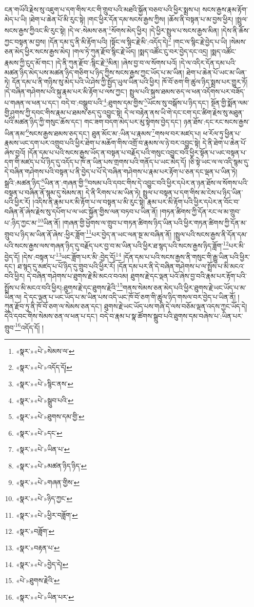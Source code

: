 ངན་གཡོའི་རྗེས་སུ་འཇུག་པ་དག་གིས་རང་གི་གྲུབ་པའི་མཐའི་སྐྱོན་བཅབ་པའི་ཕྱིར་སྨྲས་པ། སངས་རྒྱས་རྣམ་རྟོག་མེད་པ་ཡི། །ཐེག་པ་ཆེན་པོ་མི་རུང་སྟེ། །གང་ཕྱིར་དོན་དམ་སངས་རྒྱས་ཀྱིས། །ཆོས་ནི་བསྟན་པ་མ་བྱས་ཕྱིར། །སྤྲུལ་སངས་རྒྱས་ཀྱིའང་མི་རུང་སྟེ། །དེ་ལ་:སེམས་ཅན་\footnote{«སྣར་»«པེ་»སེམས་ལ་}སོགས་མེད་ཕྱིར། །དེ་ཕྱིར་སྤྲུལ་པ་སངས་རྒྱས་མིན། །དེས་ནི་ཆོས་ཀྱང་བསྟན་མ་བྱས། །དོན་དམ་དུ་ནི་མི་རྟོག་པའི། །སྟོང་ལ་སྙིང་རྗེ་མི་:འདོད་དེ།\footnote{«སྣར་»«པེ་»འདོད་དོ།} །གང་ལ་སྙིང་རྗེ་བྱེད་པ་ཡི། །སེམས་ཅན་མེད་ཕྱིར་སངས་རྒྱས་མེད། །གལ་ཏེ་ཀུན་རྫོབ་སྙིང་རྗེ་ཡོད། །སྨད་འཚོང་ངུ་བར་བྱེད་དང་འདྲ། །སྨད་འཚོང་རྣམས་ཀྱི་ངུད་མོ་གང་། །དེ་ནི་ཀུན་རྫོབ་:སྙིང་རྗེ་\footnote{«སྣར་»«པེ་»སྙིང་ནས་}མིན། །ཞེས་བྱ་བ་ལ་སོགས་པའོ། །དེ་ལ་འདིར་དོན་དམ་པའི་མཚན་ཉིད་མེད་པས་མཚན་ཉིད་གཅིག་པ་ཉིད་ཀྱིས་སངས་རྒྱས་ཀྱང་ཡོད་པ་མ་ཡིན། ཐེག་པ་ཆེན་པོ་ཡང་མ་ཡིན་ཏེ། དོན་དམ་པ་ནི་གཉིས་སུ་མེད་པའི་ཡེ་ཤེས་ཀྱི་སྤྱོད་ཡུལ་ཡིན་པའི་ཕྱིར། ཁོ་བོ་ཅག་གི་ཚུལ་ཉིད་སྨྲས་པར་གྱུར་ཏོ། །དེ་བཞིན་གཤེགས་པའི་སྐུ་རྣམ་པར་མི་རྟོག་པ་ལས་ཀྱང་། སྤྲུལ་པའི་སྐུས་ཐམས་ཅད་ལ་ཕན་འདོགས་པར་བཟོད་པ་གཞན་ལ་ཕན་པ་དང་། བདེ་བ་:བསྒྲུབ་པའི་\footnote{«སྣར་»«པེ་»སྒྲུབ་པའི་}:ཐུགས་དམ་གྱིས་\footnote{«སྣར་»«པེ་»ཐུགས་དམ་གྱི་}ཡོངས་སུ་བསྒོས་པ་ཉིད་དང་། སྔོན་གྱི་སྨོན་ལམ་གྱི་ཤུགས་ཀྱི་དབང་གིས་རྣམ་པ་ཐམས་ཅད་དུ་འབྱུང་སྟེ། དེ་ལ་བརྟེན་ནས་ཡི་གེ་དང་ངག་དང་ཚིག་རྗེས་སུ་མཐུན་པའི་མཚན་ཉིད་ཀྱི་གསུང་ཆོས་དང་། གང་ཟག་བདག་མེད་པར་མུ་སྟེགས་བྱེད་དང་། ཉན་ཐོས་:དང་རང་སངས་རྒྱས་ཡིན་ནམ་\footnote{«སྣར་»«པེ་»དང་}སངས་རྒྱས་ཐམས་ཅད་དང་། ཐུན་མོང་མ་:ཡིན་པ་རྣམས་\footnote{«སྣར་»«པེ་»ཡིན་པ་}གསལ་བར་མཛད་པ། ཕ་རོལ་ཏུ་ཕྱིན་པ་རྣམས་ཡང་དག་པར་འགྲུབ་པའི་ཕྱིར་ཐེག་པ་མཆོག་གིས་འགྲོ་བ་རྣམས་ལ་ཉེ་བར་འབྱུང་སྟེ། དེ་ནི་ཐེག་པ་ཆེན་པོ་ཞེས་བྱའོ། །དོན་དམ་པ་པའི་སངས་རྒྱས་ཡོད་ན་བསྟན་པ་བརྗོད་པའི་གསུང་འབྱུང་བའི་ཕྱིར་སྟོན་པ་ཡང་བསྟན་པ་དག་གི་མཛད་པ་པོ་ཉིད་དུ་འདོད་པ་ཁོ་ན་ཡིན་པས་གྲགས་པའི་གནོད་པ་ཡང་མེད་དོ། །ཅི་སྟེ་ཡང་ལ་ལ་འདི་སྙམ་དུ་དེ་བཞིན་གཤེགས་པའི་བསྟན་པ་ནི་བྱེད་པ་པོ་དེ་བཞིན་གཤེགས་པ་རྣམ་པར་རྟོག་པ་ཅན་དང་ལྡན་པ་ཡིན་ཏེ། སྒྲའི་:མཚན་ཉིད་\footnote{«སྣར་»«པེ་»མཚན་ཉིད་ཉིད་}ཡིན་ན་:གཞན་གྱི་\footnote{«སྣར་»«པེ་»གཞན་གྱིས་}བསམ་པའི་དབང་གིས་དེ་འབྱུང་བའི་ཕྱིར་དཔེར་ན་ཉན་ཐོས་ལ་སོགས་པའི་བསྟན་པ་བཞིན་ནོ་སྙམ་དུ་སེམས་ན། དེ་ནི་རིགས་པ་མ་ཡིན་ཏེ། སྤྲུལ་པ་བསྟན་པ་དག་གིས་མ་ངེས་པ་ཉིད་ཡིན་པའི་ཕྱིར་རོ། །འདིས་ནི་རྣམ་པར་མི་རྟོག་པ་ལ་བསྟན་པ་མི་རུང་སྟེ། རྣམ་པར་མི་རྟོག་པའི་ཕྱིར་དཔེར་ན་བོང་བ་བཞིན་ནོ་ཞེས་རྗེས་སུ་དཔོག་པ་ལ་ཡང་སྐྱོན་གྱིས་ལན་བཏབ་པ་ཡིན་ནོ། །གཏན་ཚིགས་ཀྱི་དོན་རང་ལ་མ་གྲུབ་པ་:ཉིད་ཀྱང་མ་\footnote{«སྣར་»«པེ་»ཉིད་ཀྱང་}ཡིན་ནོ། །གཞན་གྱི་ཕྱོགས་ལ་གྲུབ་པ་གཏན་ཚིགས་ཉིད་ཡིན་པའི་ཕྱིར་གཏན་ཚིགས་ཀྱི་དོན་མ་གྲུབ་པ་ཉིད་མ་ཡིན་ནོ་ཞེས་:ཕྱིར་ཟློག་\footnote{«སྣར་»«པེ་»ཕྱིར་བཟློག་}པར་བྱེད་ན་ཡང་ལན་སྔ་མ་བཞིན་ནོ། །སྤྲུལ་པའི་སངས་རྒྱས་ནི་དོན་དམ་པའི་སངས་རྒྱས་ལས་གཞན་ཉིད་དུ་བརྗོད་པར་བྱ་བ་མ་ཡིན་པའི་ཕྱིར་ཐ་སྙད་པའི་སངས་རྒྱས་ཉིད་ཟློག་\footnote{«སྣར་»བཟློག་}པར་མི་བྱེད་དོ། །དེས་:བསྟན་པ་\footnote{«སྣར་»བརྟན་པ་}ཡང་ཟློག་པར་མི་:བྱེད་དོ།\footnote{«སྣར་»«པེ་»བྱེད་དེ།} །དོན་དམ་པ་པའི་སངས་རྒྱས་ནི་གསུང་གི་རྒྱུ་ཡིན་པའི་ཕྱིར་དང་། ཐ་སྙད་དུ་མཛད་པ་པོ་ཉིད་དུ་གྲུབ་པའི་ཕྱིར་རོ། །དོན་དམ་པར་ནི་དེ་བཞིན་གཤེགས་པ་ལ་སྤྲོས་པ་མི་མངའ་བའི་ཕྱིར། དེ་བཞིན་གཤེགས་པ་ཐུགས་རྗེ་མི་མངའ་བའམ། ཐུགས་རྗེ་དང་ལྡན་པའོ་ཞེས་བྱ་བའི་རྣམ་པར་རྟོག་པའི་སྤྲོས་པ་མི་མངའ་བའི་ཕྱིར།:ཐུགས་རྗེ་དང་ཐུགས་རྗེའི་\footnote{«པེ་»ཐུགས་རྗེའི་}གནས་སེམས་ཅན་མེད་པའི་ཕྱིར་ཐུགས་རྗེ་ཡང་ཡོད་པ་མ་ཡིན་ལ། དེ་དང་ལྡན་པ་ཡང་ཡོད་པ་མ་ཡིན་པས་འདི་ཡང་ཁོ་བོ་ཅག་གི་ཚུལ་ཉིད་གསལ་བར་བྱེད་པ་ཡིན་ནོ། །ཀུན་རྫོབ་ཏུ་ནི་ཁོ་བོ་ཅག་ལ་སེམས་ཅན་དང་། ཐུགས་རྗེ་ཡང་ཡོད་པས་གཞི་དེ་ལས་བཅོམ་ལྡན་འདས་ཀྱང་ཡོད་དེ། དེའི་དབང་གིས་སེམས་ཅན་ལ་ཕན་པ་དང་། བདེ་བ་རྣམ་པ་སྣ་ཚོགས་སྒྲུབ་པའི་ཐུགས་དམ་བཞེས་པ་:ཡིན་པར་གྲུབ་\footnote{«སྣར་»«པེ་»ཡིན་པར་}འདོད་དོ། །
